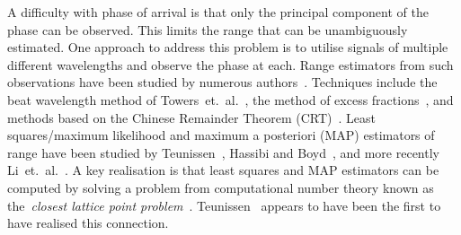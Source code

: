\documentclass[10pt,twocolumn,twoside]{IEEEtran}
\begin{document}
A difficulty with phase of arrival is that only the principal component of the phase can be observed.  This limits the range that can be unambiguously estimated.  One approach to address this problem is to utilise signals of multiple different wavelengths and observe the phase at each.   %
Range estimators from such observations have been studied by numerous authors~\cite{Teunissen_GPS_1995,Hassibi_GPS_1998,Towers_frequency_selection_interferometry_2003,Towers:04_generalised_frequency_selection,Li_distance_est_wrapped_phase, Xia2007, XWLi2008,Xiao_multistage_crt_2014}.  Techniques include the beat wavelength method of Towers~et.~al.~\cite{Towers_frequency_selection_interferometry_2003,Towers:04_generalised_frequency_selection}, the method of excess fractions~\cite{Falaggis_excess_fractions_2013}, 
and methods based on the Chinese Remainder Theorem (CRT)~\cite{Oystein_Ore_general_chinese_Remainder_1952,Yuke_new_CRT_1998, Oded_Chinese_remaindering_with_errors_2000, G.Wang_location_and_imaging_2004, Xia_generalised_CRT_2005, Xia2007, XWLi2008, Xiaowei_Li_robust_CRT_2009, W.Wang_closed_form_crt_2010, Xiaowei_Li_location_and_imaging_2011, YangBin_range_estimation_with_CRT_2014, Xiao_multistage_crt_2014}.  Least squares/maximum likelihood and maximum a posteriori (MAP) estimators of range have been studied by Teunissen~\cite{Teunissen_GPS_1995}, Hassibi and Boyd~\cite{Hassibi_GPS_1998}, and more recently Li~et.~al.~\cite{Li_distance_est_wrapped_phase}.  A key realisation is that least squares and MAP estimators can be computed by solving a problem from computational number theory known as the~\emph{closest lattice point problem}~\cite{Babai1986,Agrell2002}.  Teunissen~\cite{Teunissen_GPS_1995} appears to have been the first to have realised this connection. %
\end{document}
